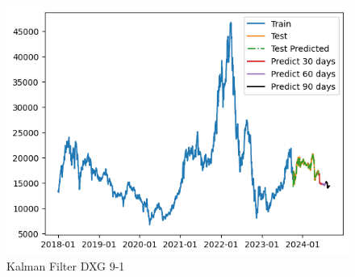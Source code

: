\documentclass[conference]{IEEEtran}
\begin{document}
\begin{enumerate}
\begin{figure}[htbp]
\begin{minipage}{0.23\textwidth}
    \includegraphics[width=1\textwidth]{experiment/kf/DXG 9-1.png}
    \caption{Kalman Filter DXG 9-1}
    \label{fig:nvl_histogram}
    \end{minipage}


\end{figure}
\end{enumerate}
\end{document}
